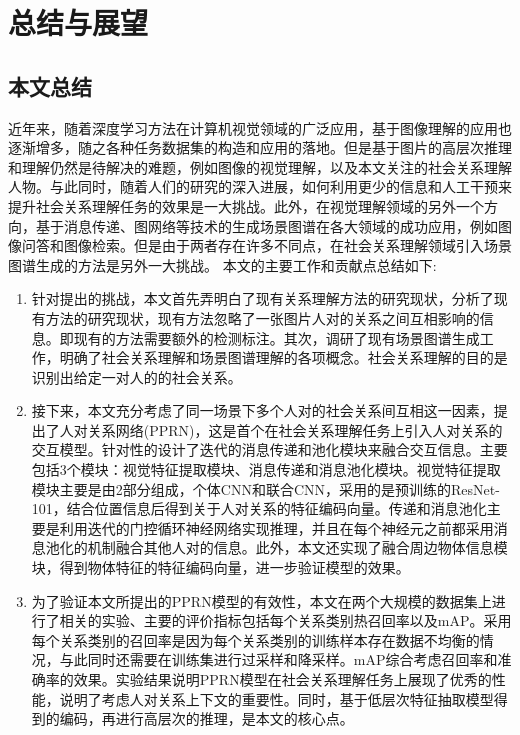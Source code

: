 
\chapter{总结与展望}
\label{ch:conclusion}

\section{本文总结}

近年来，随着深度学习方法在计算机视觉领域的广泛应用，基于图像理解的应用也逐渐增多，随之各种任务数据集的构造和应用的落地。但是基于图片的高层次推理和理解仍然是待解决的难题，例如图像的视觉理解，以及本文关注的社会关系理解人物。与此同时，随着人们的研究的深入进展，如何利用更少的信息和人工干预来提升社会关系理解任务的效果是一大挑战。此外，在视觉理解领域的另外一个方向，基于消息传递、图网络等技术的生成场景图谱在各大领域的成功应用，例如图像问答和图像检索。但是由于两者存在许多不同点，在社会关系理解领域引入场景图谱生成的方法是另外一大挑战。
本文的主要工作和贡献点总结如下:
\begin{enumerate}
    \item 针对提出的挑战，本文首先弄明白了现有关系理解方法的研究现状，分析了现有方法的研究现状，现有方法忽略了一张图片人对的关系之间互相影响的信息。即现有的方法需要额外的检测标注。其次，调研了现有场景图谱生成工作，明确了社会关系理解和场景图谱理解的各项概念。社会关系理解的目的是识别出给定一对人的的社会关系。
    \item 接下来，本文充分考虑了同一场景下多个人对的社会关系间互相这一因素，提出了人对关系网络(PPRN)，这是首个在社会关系理解任务上引入人对关系的交互模型。针对性的设计了迭代的消息传递和池化模块来融合交互信息。主要包括3个模块：视觉特征提取模块、消息传递和消息池化模块。视觉特征提取模块主要是由2部分组成，个体CNN和联合CNN，采用的是预训练的ResNet-101，结合位置信息后得到关于人对关系的特征编码向量。传递和消息池化主要是利用迭代的门控循环神经网络实现推理，并且在每个神经元之前都采用消息池化的机制融合其他人对的信息。此外，本文还实现了融合周边物体信息模块，得到物体特征的特征编码向量，进一步验证模型的效果。
    \item 为了验证本文所提出的PPRN模型的有效性，本文在两个大规模的数据集上进行了相关的实验、主要的评价指标包括每个关系类别热召回率以及mAP。采用每个关系类别的召回率是因为每个关系类别的训练样本存在数据不均衡的情况，与此同时还需要在训练集进行过采样和降采样。mAP综合考虑召回率和准确率的效果。实验结果说明PPRN模型在社会关系理解任务上展现了优秀的性能，说明了考虑人对关系上下文的重要性。同时，基于低层次特征抽取模型得到的编码，再进行高层次的推理，是本文的核心点。
\end{enumerate}

